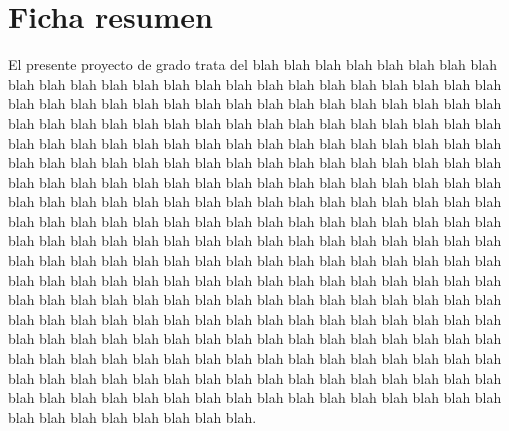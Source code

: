 \chapter*{Ficha resumen}
El presente proyecto de grado trata del blah blah blah blah blah blah blah blah blah blah blah blah blah blah blah blah blah blah blah blah blah blah blah blah blah blah blah blah blah blah blah blah blah blah blah blah blah blah blah blah blah blah blah blah blah blah blah blah blah blah blah blah blah blah blah blah blah blah blah blah blah blah blah blah blah blah blah blah blah blah blah blah blah blah blah blah blah blah blah blah blah blah blah blah blah blah blah blah blah blah blah blah blah blah blah blah blah blah blah blah blah blah blah blah blah blah blah blah blah blah blah blah blah blah blah blah blah blah blah blah blah blah blah blah blah blah blah blah blah blah blah blah blah blah blah blah blah blah blah blah blah blah blah blah blah blah blah blah blah blah blah blah blah blah blah blah blah blah blah blah blah blah blah blah blah blah blah blah blah blah blah blah blah blah blah blah blah blah blah blah blah blah blah blah blah blah blah blah blah blah blah blah blah blah blah blah blah blah blah blah blah blah blah blah blah blah blah blah blah blah blah blah blah blah blah blah blah blah blah blah blah blah blah blah blah blah blah blah blah blah blah blah blah blah blah blah blah blah blah blah blah blah blah blah blah blah blah blah blah blah blah blah blah blah blah blah blah blah blah blah blah blah blah blah blah blah blah blah blah blah blah blah blah blah blah blah blah blah blah blah blah blah blah blah blah blah blah blah.
\cleardoublepage
